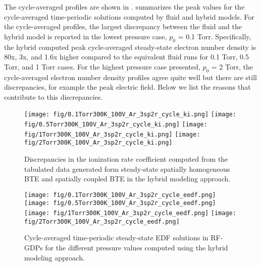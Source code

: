 The cycle-averaged profiles are shown in .  summarizes the peak values for the cycle-averaged time-periodic solutions computed by fluid and hybrid models. For the cycle-averaged profiles, the largest discrepancy between the fluid and the hybrid model is reported in the lowest pressure case, $p_0$ = 0.1 Torr. Specifically, the hybrid computed peak cycle-averaged steady-state electron number density is 80x, 3x, and 1.6x higher compared to the equivalent fluid runs for 0.1 Torr, 0.5 Torr, and 1 Torr cases. For the highest pressure case presented, $p_0$ = 2 Torr, the cycle-averaged electron number density profiles agree quite well but there are still discrepancies, for example the peak electric field. Below we list the reasons that contribute to this discrepancies. 

\begin{figure}[!tbhp]
	\texttt{[image: fig/0.1Torr300K\_100V\_Ar\_3sp2r\_cycle\_ki.png]} 
	\texttt{[image: fig/0.5Torr300K\_100V\_Ar\_3sp2r\_cycle\_ki.png]} 
	\texttt{[image: fig/1Torr300K\_100V\_Ar\_3sp2r\_cycle\_ki.png]}   
	\texttt{[image: fig/2Torr300K\_100V\_Ar\_3sp2r\_cycle\_ki.png]}   
	\caption{Discrepancies in the ionization rate coefficient computed from the tabulated data generated form steady-state spatially homogeneous BTE and spatially coupled BTE in the hybrid modeling approach. \label{fig:ki_fluid_vs_hybrid}}
\end{figure}

\begin{figure}[!tbhp]
	\centering
	\texttt{[image: fig/0.1Torr300K\_100V\_Ar\_3sp2r\_cycle\_eedf.png]}
	\texttt{[image: fig/0.5Torr300K\_100V\_Ar\_3sp2r\_cycle\_eedf.png]}
	\texttt{[image: fig/1Torr300K\_100V\_Ar\_3sp2r\_cycle\_eedf.png]}
	\texttt{[image: fig/2Torr300K\_100V\_Ar\_3sp2r\_cycle\_eedf.png]}
	\caption{Cycle-averaged time-periodic steady-state EDF solutions in RF-GDPs for the different pressure values computed using the hybrid modeling approach. \label{fig:eedf_hybrid}}
\end{figure}

